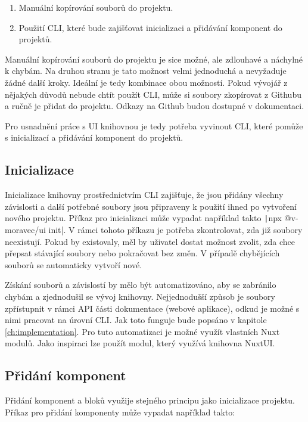 \begin{enumerate}
  \item Manuální kopírování souborů do projektu.
  \item Použití CLI, které bude zajišťovat inicializaci a přidávání komponent do projektů.
\end{enumerate}

Manuální kopírování souborů do projektu je sice možné, ale zdlouhavé a náchylné k chybám. Na druhou stranu je tato možnost velmi jednoduchá a nevyžaduje žádné další kroky. Ideální je tedy kombinace obou možností.
Pokud vývojář z nějakých důvodů nebude chtít použít CLI, může si soubory zkopírovat z Githubu a ručně je přidat do projektu. Odkazy na Github budou dostupné v dokumentaci.

Pro usnadnění práce s UI knihovnou je tedy potřeba vyvinout CLI, které pomůže s inicializací a přidávání komponent do projektů.

\subsection{Inicializace}
Inicializace knihovny prostřednictvím CLI zajišťuje, že jsou přidány všechny závislosti a další potřebné soubory jsou připraveny k použití ihned po vytvoření nového projektu. Příkaz pro inicializaci může vypadat například takto \texttt|npx @v-moravec/ui init|. V rámci tohoto příkazu je potřeba zkontrolovat, zda již soubory neexistují. Pokud by existovaly, měl by uživatel dostat možnost zvolit, zda chce přepsat stávající soubory nebo pokračovat bez změn. V případě chybějících souborů se automaticky vytvoří nové.

Získání souborů a závislostí by mělo být automatizováno, aby se zabránilo chybám a zjednodušil se vývoj knihovny. Nejjednodušší způsob je soubory zpřístupnit v rámci API části dokumentace (webové aplikace), odkud je možné s nimi pracovat na úrovní CLI. Jak toto funguje bude popsáno v kapitole \ref{ch:implementation}. Pro tuto automatizaci je možné využít vlastních Nuxt modulů. Jako inspiraci lze použít modul, který využívá knihovna NuxtUI. \cite{NuxtUISourceCodeModule}

\subsection{Přidání komponent}
Přidání komponent a bloků využije stejného principu jako inicializace projektu. Příkaz pro přidání komponenty může vypadat například takto:\\

